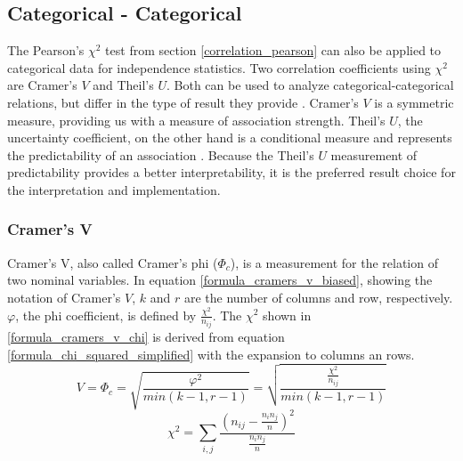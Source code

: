 \documentclass[a4paper,12pt]{report}
\begin{document}

\subsection{Categorical - Categorical}
The Pearson's $\chi^2$ test from section \ref{correlation_pearson} can also be applied to categorical data for independence statistics. Two correlation coefficients using $\chi^2$ are Cramer’s $V$ and Theil’s $U$. Both can be used to analyze categorical-categorical relations, but differ in the type of result they provide \cite{OutsideTwoStandardDeviations2018}. Cramer’s $V$ is a symmetric measure, providing us with a measure of association strength. Theil’s $U$, the uncertainty coefficient, on the other hand is a conditional measure and represents the predictability of an association \cite{Akoglu2018,StackExchange2020}. Because the Theil’s $U$ measurement of predictability provides a better interpretability, it is the preferred  result choice for the interpretation and implementation. 

\subsubsection{Cramer’s V}

Cramer’s V, also called Cramer's phi ($\Phi_c$), is a measurement for the relation of two nominal variables. In equation \ref{formula_cramers_v_biased}, showing the notation of Cramer’s $V$, $k$ and $r$ are the number of columns and row, respectively. $\varphi$, the phi coefficient, is defined by $\frac{{\chi^2}}{n_{ij}}$. The $\chi^2$ shown in \ref{formula_cramers_v_chi} is derived from equation \ref{formula_chi_squared_simplified} with the expansion to columns an rows. \cite{Sheskin1997,Bergsma2013}
\smallskip
\begin{equation}
\label{formula_cramers_v_biased}
	V = \Phi_c =  \sqrt{\frac{{\varphi^2}}{min(k-1,r-1)}} = \sqrt{\frac{\frac{{\chi^2}}{n_{ij}}}{min(k-1,r-1)}}
\end{equation}
\begin{equation}
\label{formula_cramers_v_chi}
	\chi^2 =  \sum_{i,j}{\frac{(n_{ij}-\frac{n_i n_j}{n})^2}{\frac{n_i n_j}{n}}}
\end{equation}

\smallskip
\end{document}
